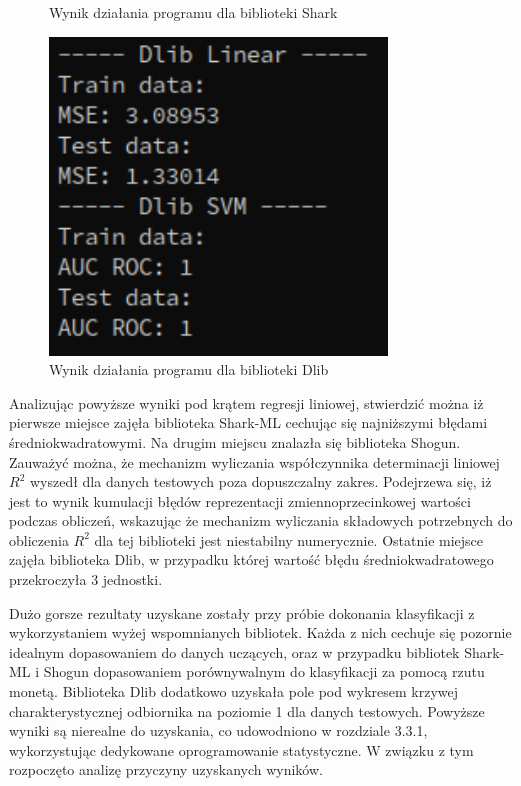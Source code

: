\begin{figure}[!ht]
\begin{minipage}{0.31\textwidth}
		\caption{Wynik działania programu dla biblioteki Shark}
		\label{fig:shark_linear_svm}		
	\end{minipage}%
	\hspace{0.02\textwidth}
	\begin{minipage}{0.31\textwidth}
		\centering
		\includegraphics[width=0.8\textwidth]{Rysunki/Rozdzial7/dlib}
		\caption{Wynik działania programu dla biblioteki Dlib}
		\label{fig:dlib_linear_svm}
	\end{minipage}
\end{figure}

Analizując powyższe wyniki pod krątem regresji liniowej, stwierdzić można iż pierwsze miejsce zajęła biblioteka Shark-ML cechując się najniższymi błędami średniokwadratowymi. Na drugim miejscu znalazła się biblioteka Shogun. Zauważyć można, że mechanizm wyliczania współczynnika determinacji liniowej $R^2$ wyszedł dla danych testowych poza dopuszczalny zakres. Podejrzewa się, iż jest to wynik kumulacji błędów reprezentacji zmiennoprzecinkowej wartości podczas obliczeń, wskazując że mechanizm wyliczania składowych potrzebnych do obliczenia $R^2$ dla tej biblioteki jest niestabilny numerycznie. Ostatnie miejsce zajęła biblioteka Dlib, w przypadku której wartość błędu średniokwadratowego przekroczyła 3 jednostki.

Dużo gorsze rezultaty uzyskane zostały przy próbie dokonania klasyfikacji z wykorzystaniem wyżej wspomnianych bibliotek. Każda z nich cechuje się pozornie idealnym dopasowaniem do danych uczących, oraz w przypadku bibliotek Shark-ML i Shogun dopasowaniem porównywalnym do klasyfikacji za pomocą rzutu monetą. Biblioteka Dlib dodatkowo uzyskała pole pod wykresem krzywej charakterystycznej odbiornika na poziomie 1 dla danych testowych. Powyższe wyniki są nierealne do uzyskania, co udowodniono w rozdziale 3.3.1, wykorzystując dedykowane oprogramowanie statystyczne. W związku z tym rozpoczęto analizę przyczyny uzyskanych wyników. 

